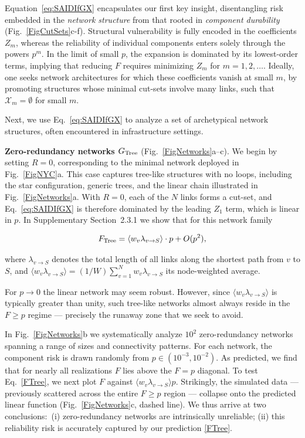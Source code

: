 \documentclass[oneside, a4paper, onecolumn, 11pt]{article}
\newcommand{\av}[1]{\langle #1 \rangle}
\newcommand{\X}{\mathcal X}
\begin{document}
\begin{refsection}
Equation~\eqref{eq:SAIDIfGX} encapsulates our first key insight, disentangling risk embedded in the \textit{network structure} from that rooted in \textit{component durability} (Fig.\ \ref{FigCutSets}c-f). Structural vulnerability is fully encoded in the coefficients $Z_m$, whereas the reliability of individual components enters solely through the powers $p^m$. In the limit of small $p$, the expansion is dominated by its lowest-order terms, implying that reducing $F$ requires minimizing $Z_m$ for $m = 1,2,\dots$. Ideally, one seeks network architectures for which these coefficients vanish at small $m$, by promoting structures whose minimal cut-sets involve many links, such that $\X_m = \emptyset$ for small $m$.

Next, we use Eq.\ \eqref{eq:SAIDIfGX} to analyze a set of archetypical network structures, often encountered in infrastructure settings. 


\vspace{3mm}
\textbf{\color{blue} Zero-redundancy networks $G_{\rm Tree}$} (Fig.\ \ref{FigNetworks}a–c).
We begin by setting $R = 0$, corresponding to the minimal network deployed in Fig.\ \ref{FigNYC}a. This case captures tree-like structures with no loops, including the star configuration, generic trees, and the linear chain illustrated in Fig.\ \ref{FigNetworks}a. With $R = 0$, each of the $N$ links forms a cut-set, and Eq.\ \eqref{eq:SAIDIfGX} is therefore dominated by the leading $Z_1$ term, which is linear in $p$. In Supplementary Section~2.3.1 we show that for this network family

\begin{equation}
F_{\rm Tree} = \av {w_v \lambda_{v \to S}}\cdot p + O(p^2),
\label{FTree}
\end{equation}

where $\lambda_{v \to S}$ denotes the total length of all links along the shortest path from $v$ to $S$, and $\av{w_v \lambda_{v \to S}} = (1/W) \sum_{v = 1}^N w_v \lambda_{v \to S}$ its node-weighted average.

For $p \to 0$ the linear network may seem robust. However, since $\av {w_v \lambda_{v \to S}}$ is typically greater than unity, such tree-like networks almost always reside in the $F \ge p$ regime — precisely the runaway zone that we seek to avoid.

In Fig.\ \ref{FigNetworks}b we systematically analyze $10^2$ zero-redundancy networks spanning a range of sizes and connectivity patterns. For each network, the component risk is drawn randomly from $p \in (10^{-3},10^{-2})$. As predicted, we find that for nearly all realizations $F$ lies above the $F = p$ diagonal. To test Eq.\ \eqref{FTree}, we next plot $F$ against $\av{w_v \lambda_{v \to S}}p$. Strikingly, the simulated data — previously scattered across the entire $F \ge p$ region — collapse onto the predicted linear function (Fig.\ \ref{FigNetworks}c, dashed line). We thus arrive at two conclusions:\ (i) zero-redundancy networks are intrinsically unreliable; (ii) this reliability risk is accurately captured by our prediction \eqref{FTree}.


\end{refsection}
\end{document}
